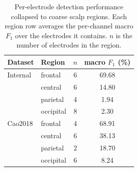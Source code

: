 \begin{table}[ht]
  \centering
  \caption{Per-electrode detection performance collapsed to coarse scalp regions. Each region row averages the per-channel macro $F_1$ over the electrodes it contains. $n$ is the number of electrodes in the region.}
  \label{tab:region_performance}
  \begin{tabular}{llcc}
    \toprule
    Dataset & Region & $n$ & macro $F_1$ (\%) \\
    \midrule
    Internal & frontal & 6 & 69.68 \\
     & central & 6 & 14.80 \\
     & parietal & 4 & 1.94 \\
     & occipital & 8 & 2.30 \\
    \midrule
    Cao2018 & frontal & 4 & 68.91 \\
     & central & 6 & 38.13 \\
     & parietal & 2 & 18.70 \\
     & occipital & 6 & 8.24 \\
    \bottomrule
  \end{tabular}
\end{table}

